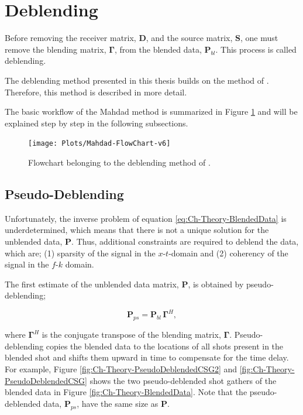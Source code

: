 \section{Deblending} \label{sec:MahdadMethod}

Before removing the receiver matrix, $\mathbf{D}$, and the source matrix, $\mathbf{S}$, one must remove  the blending matrix, $\mathbf{\Gamma}$, from the blended data, $\mathbf{P}_{bl}$. This process is called deblending.

The deblending method presented in this thesis builds on the method of \citet{Mahdad-Deblending-Method}. Therefore, this method is described in more detail.

The basic workflow of the Mahdad method is summarized in Figure \ref{fig:Ch-Theory-FlowChart} and will be explained step by step in the following subsections. 

\begin{figure}
	\centering
	\texttt{[image: Plots/Mahdad-FlowChart-v6]}
	\caption{Flowchart belonging to the deblending method of \citet{Mahdad-Deblending-Method}.}
	\label{fig:Ch-Theory-FlowChart}
\end{figure}

\subsection{Pseudo-Deblending}

Unfortunately, the inverse problem of equation \ref{eq:Ch-Theory-BlendedData} is underdetermined, which means that there is not a unique solution for the unblended data, $\mathbf{P}$. Thus, additional constraints are required to deblend the data, which are; (1) sparsity of the signal in the $x$-$t$-domain and (2) coherency of the signal in the $f$-$k$ domain. 

The first estimate of the unblended data matrix, $\mathbf{P}$, is obtained by pseudo-deblending;

\begin{equation}
	\mathbf{P}_{ps} = \mathbf{P}_{bl} \, \mathbf{\Gamma}^H,
	\label{eq:Ch-Theory-PseudoDeblended}
\end{equation}

where $\mathbf{\Gamma}^H$ is the conjugate transpose of the blending matrix, $\mathbf{\Gamma}$. Pseudo-deblending copies the blended data to the locations of all shots present in the blended shot and shifts them  upward in time to compensate for the time delay. For example, Figure \ref{fig:Ch-Theory-PseudoDeblendedCSG2} and \ref{fig:Ch-Theory-PseudoDeblendedCSG} shows the two pseudo-deblended shot gathers of the blended data in Figure \ref{fig:Ch-Theory-BlendedData}. Note that the pseudo-deblended data, $\mathbf{P}_{ps}$, have the same size as $\mathbf{P}$.


